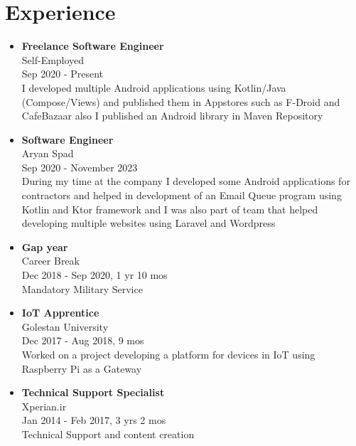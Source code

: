 \section*{\LARGE{Experience}}
\begin{itemize}
    \item \large{\textbf{Freelance Software Engineer}\\Self-Employed\\}\normalsize{Sep 2020 - Present\\I developed multiple Android applications using Kotlin/Java (Compose/Views) and published them in Appstores such as F-Droid and CafeBazaar also I published an Android library in Maven Repository}
    \item \large{\textbf{Software Engineer}\\Aryan Spad\\}\normalsize{Sep 2020 - November 2023\\During my time at the company I developed some Android applications for contractors and helped in development of an Email Queue program using Kotlin and Ktor framework and I was also part of team that helped developing multiple websites using Laravel and Wordpress}
    \item \large{\textbf{Gap year}\\Career Break\\}\normalsize{Dec 2018 - Sep 2020}, 1 yr 10 mos\\ Mandatory Military Service
    \item \large{\textbf{IoT Apprentice}\\Golestan University\\}\normalsize{Dec 2017 - Aug 2018, 9 mos\\Worked on a project developing a platform for devices in IoT using Raspberry Pi as a Gateway}
    \item \large{\textbf{Technical Support Specialist}\\Xperian.ir\\}\normalsize{Jan 2014 - Feb 2017, 3 yrs 2 mos\\Technical Support and content creation}
\end{itemize}